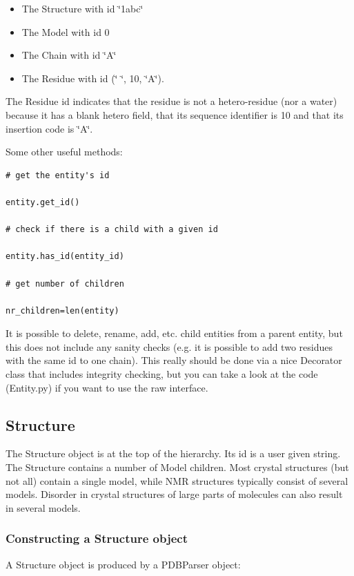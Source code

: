 \documentclass{report}
\begin{document}
\begin{itemize}
\item The Structure with id \char`\"{}1abc\char`\"{}
\item The Model with id 0
\item The Chain with id \char`\"{}A\char`\"{}
\item The Residue with id (\char`\"{} \char`\"{}, 10, \char`\"{}A\char`\"{}).
\end{itemize}
The Residue id indicates that the residue is not a hetero-residue (nor a water)
because it has a blank hetero field, that its sequence identifier is 10 and
that its insertion code is \char`\"{}A\char`\"{}.

Some other useful methods:

\begin{verbatim}
# get the entity's id

entity.get_id()

# check if there is a child with a given id

entity.has_id(entity_id)

# get number of children

nr_children=len(entity)
\end{verbatim}

It is possible to delete, rename, add, etc. child entities from a parent entity,
but this does not include any sanity checks (e.g. it is possible to add two
residues with the same id to one chain). This really should be done via a nice
Decorator class that includes integrity checking, but you can take a look at
the code (Entity.py) if you want to use the raw interface.

\subsection{Structure}

The Structure object is at the top of the hierarchy. Its id is a user given
string. The Structure contains a number of Model children. Most crystal structures
(but not all) contain a single model, while NMR structures typically consist
of several models. Disorder in crystal structures of large parts of molecules
can also result in several models.

\subsubsection{Constructing a Structure object}

A Structure object is produced by a PDBParser object:
\end{document}
